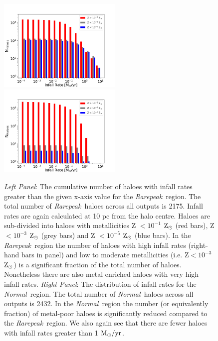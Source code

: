 \documentclass[graphics, twocolumn, usenatbib]{mn2e}
\newcommand{\msolaryrc} {$\rm{M_{\odot}/yr}$}
\newcommand{\zsolar} {$\rm{Z_{\odot}}~$}
\newcommand{\zsolarc} {$\rm{Z_{\odot}}$}
\newcommand{\rarepeak} {\textit{Rarepeak~}}
\newcommand{\normal} {\textit{Normal~}}
\begin{document}
\begin{figure}
\centering
\begin{minipage}{175mm}      \begin{center} 
\centerline{
\includegraphics[width=0.525\textwidth]{FIGURES/Rarepeak_NHaloes.png}
\includegraphics[width=0.525\textwidth]{FIGURES/Normal_NHaloes.png}}
\caption{\textit{Left Panel}: The cumulative number of haloes with infall rates greater than the given
  x-axis value for the \rarepeak region.  The total number of \rarepeak haloes across all outputs
  is 2175. Infall rates are again calculated at 10 pc from the halo centre.
  Haloes are sub-divided into haloes with metallicities Z $< 10^{-1}$ \zsolar (red bars),
  Z $< 10^{-3}$ \zsolar (grey bars) and  Z $< 10^{-5}$ \zsolar (blue bars). In the \rarepeak region
  the number of haloes with high infall rates (right-hand bars in panel) and low to moderate metallicities
  (i.e. Z$ < 10^{-3}$ \zsolarc) is a significant fraction of the total number of haloes. Nonetheless there
  are also metal enriched haloes with very high infall rates. \textit{Right Panel}: The distribution of
  infall rates for the \normal region. The  total number of \normal haloes across all outputs is 2432.
  In the \normal region the number (or equivalently fraction) of metal-poor haloes is significantly reduced
  compared to the \rarepeak region. We also again see that there are fewer haloes with infall rates greater
  than 1 \msolaryrc. } \label{Fig:Histogram}
\end{center} \end{minipage}

\end{figure}
\end{document}
